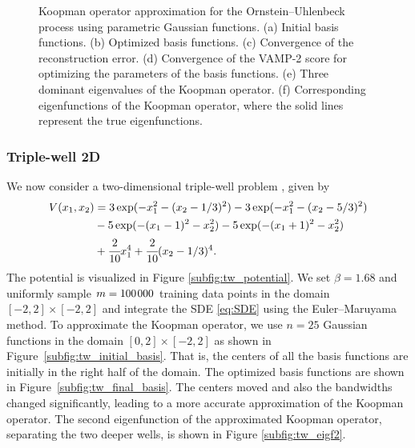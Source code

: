 \documentclass
[
    a4paper,
    DIV=11,
    abstract=true,
    11pt,
]
{scrartcl}
\newcommand{\ts}{\hspace*{0.1em}}                                %
\theoremstyle{definition}
\begin{document}
\begin{figure}
  \quad
  \caption{Koopman operator approximation for the Ornstein--Uhlenbeck process using parametric Gaussian functions. (a) Initial basis functions. (b) Optimized basis functions. (c) Convergence of the reconstruction error. (d) Convergence of the VAMP-2 score for optimizing the parameters of the basis functions. (e) Three dominant eigenvalues of the Koopman operator. (f) Corresponding eigenfunctions of the Koopman operator, where the solid lines represent the true eigenfunctions.}
  \label{fig:OU_results}
\end{figure}

\subsubsection{Triple-well 2D}

We now consider a two-dimensional triple-well problem \cite{schutte2013metastability}, given by
\begin{align*}
        V(x_1,x_2)&=3\exp({-x_1^2-(x_2-1/3)^2})-3\exp({-x_1^2-(x_2-5/3)^2}) \\ \nonumber
    & -5\exp(-(x_1-1)^2-x_2^2) - 5\exp(-(x_1+1)^2-x_2^2) \\ \nonumber
    &+\cfrac{2}{10}x_1^4 + \cfrac{2}{10}(x_2-1/3)^4.
\end{align*}
The potential is visualized in Figure \ref{subfig:tw_potential}. We set $\beta = 1.68$ and uniformly sample $m = 100\ts000$ training data points in the domain $[-2, 2] \times [-2, 2]$ and integrate the SDE \eqref{eq:SDE} using the Euler--Maruyama method. To approximate the Koopman operator, we use $n = 25$ Gaussian functions in the domain $[0,2] \times [-2,2]$ as shown in Figure~\ref{subfig:tw_initial_basis}. That is, the centers of all the basis functions are initially in the right half of the domain. The optimized basis functions are shown in Figure~\ref{subfig:tw_final_basis}. The centers moved and also the bandwidths changed significantly, leading to a more accurate approximation of the Koopman operator. The second eigenfunction of the approximated Koopman operator, separating the two deeper wells, is shown in Figure \ref{subfig:tw_eigf2}.
\end{document}
